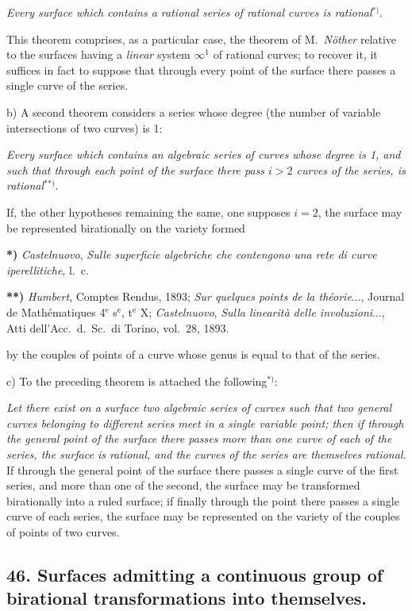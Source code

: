 \documentclass{article}
\begin{document}
\emph{Every surface which contains a rational series of rational curves is rational}${}^{*)}$.

This theorem comprises, as a particular case, the theorem of M.\ \emph{Nöther} relative to the surfaces having a \emph{linear} system $\infty^{1}$ of rational curves; to recover it, it suffices in fact to suppose that through every point of the surface there passes a single curve of the series.

b) A second theorem considers a series whose degree (the number of variable intersections of two curves) is 1:

\emph{Every surface which contains an algebraic series of curves whose degree is 1, and such that through each point of the surface there pass $i > 2$ curves of the series, is rational}${}^{**)}$.

If, the other hypotheses remaining the same, one supposes $i = 2$, the surface may be represented birationally on the variety formed

\textbf{*)} \emph{Castelnuovo}, \emph{Sulle superficie algebriche che contengono una rete di curve iperellitiche}, l.\ c.

\textbf{**)} \emph{Humbert}, Comptes Rendus, 1893; \emph{Sur quelques points de la théorie}..., Journal de Mathématiques 4${}^{\text{e}}$ s${}^{\text{e}}$, t${}^{\text{e}}$ X; \emph{Castelnuovo}, \emph{Sulla linearità delle involuzioni}..., Atti dell'Acc.\ d.\ Sc.\ di Torino, vol.\ 28, 1893.

by the couples of points of a curve whose genus is equal to that of the series.

c) To the preceding theorem is attached the following${}^{*)}$:

\emph{Let there exist on a surface two algebraic series of curves such that two general curves belonging to different series meet in a single variable point; then if through the general point of the surface there passes more than one curve of each of the series, the surface is rational, and the curves of the series are themselves rational.} If through the general point of the surface there passes a single curve of the first series, and more than one of the second, the surface may be transformed birationally into a ruled surface; if finally through the point there passes a single curve of each series, the surface may be represented on the variety of the couples of points of two curves.

\subsection*{46. Surfaces admitting a continuous group of birational transformations into themselves.}
\end{document}
